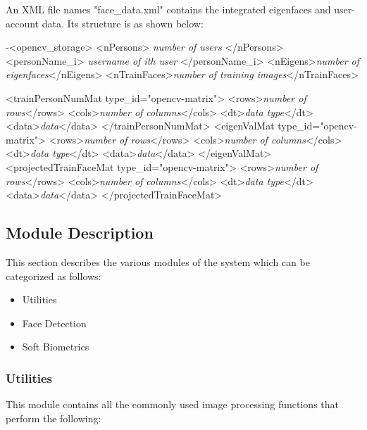 \documentclass[12pt]{article}			%
\begin{document}
An XML file names "face_data.xml" contains the integrated eigenfaces and user-account data. Its structure is as shown below:

-<opencv_storage>
	<nPersons> \textit{number of users} </nPersons>
	<personName_i> \textit{username of ith user} </personName_i>
	<nEigens>\textit{number of eigenfaces}</nEigens>
	<nTrainFaces>\textit{number of training images}</nTrainFaces>
	
	<trainPersonNumMat type_id="opencv-matrix">
		<rows>\textit{number of rows}</rows>
		<cols>\textit{number of columns}</cols>
		<dt>\textit{data type}</dt>
		<data>\textit{data}</data>
	</trainPersonNumMat>
	<eigenValMat type_id="opencv-matrix">
		<rows>\textit{number of rows}</rows>
		<cols>\textit{number of columns}</cols>
		<dt>\textit{data type}</dt>
		<data>\textit{data}</data>
	</eigenValMat>
	<projectedTrainFaceMat type_id="opencv-matrix">
		<rows>\textit{number of rows}</rows>
		<cols>\textit{number of columns}</cols>
		<dt>\textit{data type}</dt>
		<data>\textit{data}</data>
	</projectedTrainFaceMat>

\subsection{ Module Description }
This section describes the various modules of the system which can be categorized as follows:
\begin{itemize}
\item Utilities
\item Face Detection
\item Soft Biometrics
\end{itemize}

\subsubsection { Utilities }
This module contains all the commonly used image processing functions that perform the following:
\end{document}
